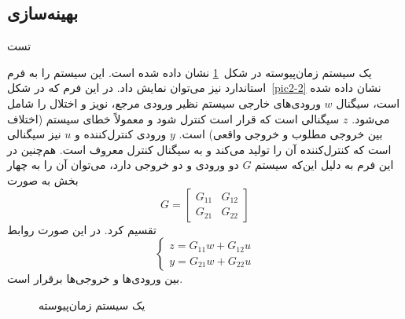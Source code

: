 \subsection{
بهینه‌سازی
}
تست








\bigbreak\bigbreak\bigbreak\bigbreak\bigbreak\bigbreak
\bigbreak\bigbreak\bigbreak\bigbreak\bigbreak\bigbreak


\newcommand{\norm}[1]{\lVert#1\lVert}


یک سیستم زمان‌پیوسته در شکل~\ref{pic2-1} نشان داده شده است. این سیستم را به فرم استاندارد نیز می‌توان نمایش داد. در این فرم که در شکل~\ref{pic2-2} نشان داده شده است، سیگنال $w$ ورودی‌های خارجی سیستم نظیر ورودی مرجع، نویز و اختلال را شامل می‌شود. $z$ سیگنالی است که قرار است کنترل شود و معمولاً خطای سیستم (اختلاف بین خروجی مطلوب و خروجی واقعی) است. $y$ ورودی کنترل‌کننده و $u$ نیز سیگنالی است که کنترل‌کننده آن را تولید می‌کند و به سیگنال کنترل معروف است. هم‌چنین در این فرم به دلیل این‌که سیستم $G$ دو ورودی و دو خروجی دارد، می‌توان آن را به چهار بخش به صورت 
\begin{equation*}
G=
\begin{bmatrix}
G_{11}&G_{12}\\G_{21}&G_{22}
\end{bmatrix} 
\end{equation*}
تقسیم کرد. در این صورت روابط
\begin{equation*}
\left\{\begin{array}{l}
z=G_{11}w+G_{12}u\\
y=G_{21}w+G_{22}u
\end{array}\right. 
\end{equation*}
بین ورودی‌ها و خروجی‌ها برقرار است.

\setlength{\unitlength}{1cm}
\begin{figure}[b]
\centering
{}
\caption{یک سیستم زمان‌پیوسته}
\label{pic2-1}
\end{figure} 


